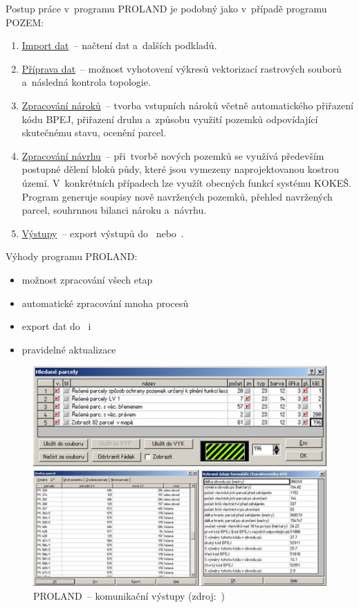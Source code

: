 Postup práce v~programu PROLAND je podobný jako v~případě programu
POZEM: \vspace{-\topsep}
	\begin{enumerate}[leftmargin=1.5cm, noitemsep]
		\item \underline{Import dat}~– načtení dat 
a~dalších podkladů.
		\item \underline{Příprava dat}~– možnost vyhotovení
výkresů vektorizací rastrových souborů a~následná kontrola topologie.
		\item \underline{Zpracování nároků}~– tvorba vstupních
nároků včetně automatického přiřaze\-ní kódu BPEJ, přiřazení druhu
a~způsobu využití pozemků odpovídající skutečnému stavu, ocenění
parcel.
		\item \underline{Zpracování návrhu}~– při~tvorbě
nových pozemků se využívá především postupné dělení bloků půdy, které
jsou vymezeny naprojektovanou kostrou území. V~konkrétních případech
lze využít obecných funkcí systému KOKEŠ. Program generuje soupisy
nově navržených pozemků, přehled navržených parcel, souhrnnou bilanci
nároku a~návrhu.
		\item \underline{Výstupy}~– export výstupů do~
nebo~.
	\end{enumerate}

Výhody programu PROLAND: \vspace{-\topsep}
	\begin{itemize}[leftmargin=1.5cm, noitemsep]
		\item možnost zpracování všech etap 
		\item automatické zpracování mnoha procesů 
		\item export dat do~ i~
		\item pravidelné aktualizace
	\end{itemize}

	\begin{figure}[H] \centering
		\includegraphics[width=.8\textwidth]{./pictures/proland.png}
		\caption[PROLAND~– komunikační výstupy]{PROLAND~–
komunikační výstupy (zdroj:~\citep{proland_obrazek})}
		\label{fig:proland_obrazek}
 	\end{figure}

